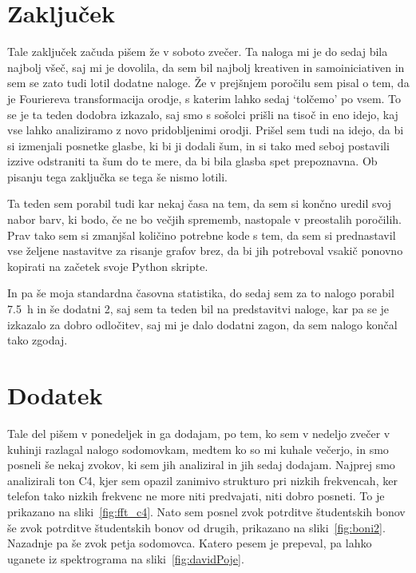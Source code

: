 \documentclass{porocilo}
\begin{document}
\section{Zaključek}
Tale zaključek začuda pišem že v soboto zvečer. Ta naloga mi je do sedaj bila najbolj všeč, saj mi je dovolila, da sem bil najbolj kreativen in samoiniciativen in sem se zato tudi lotil dodatne naloge. Že v prejšnjem poročilu sem pisal o tem, da je Fouriereva transformacija orodje, s katerim lahko sedaj `tolčemo' po vsem. To se je ta teden dodobra izkazalo, saj smo s sošolci prišli na tisoč in eno idejo, kaj vse lahko analiziramo z novo pridobljenimi orodji. Prišel sem tudi na idejo, da bi si izmenjali posnetke glasbe, ki bi ji dodali šum, in si tako med seboj postavili izzive odstraniti ta šum do te mere, da bi bila glasba spet prepoznavna. Ob pisanju tega zaključka se tega še nismo lotili.

Ta teden sem porabil tudi kar nekaj časa na tem, da sem si končno uredil svoj nabor barv, ki bodo, če ne bo večjih sprememb, nastopale v preostalih poročilih. Prav tako sem si zmanjšal količino potrebne kode s tem, da sem si prednastavil vse željene nastavitve za risanje grafov brez, da bi jih potreboval vsakič ponovno kopirati na začetek svoje Python skripte.

In pa še moja standardna časovna statistika, do sedaj sem za to nalogo porabil \SI{7.5}{\hour} in še dodatni 2, saj sem ta teden bil na predstavitvi naloge, kar pa se je izkazalo za dobro odločitev, saj mi je dalo dodatni zagon, da sem nalogo končal tako zgodaj.

\section{Dodatek}
Tale del pišem v ponedeljek in ga dodajam, po tem, ko sem v nedeljo zvečer v kuhinji razlagal nalogo sodomovkam, medtem ko so mi kuhale večerjo, in smo posneli še nekaj zvokov, ki sem jih analiziral in jih sedaj dodajam. Najprej smo analizirali ton C4, kjer sem opazil zanimivo strukturo pri nizkih frekvencah, ker telefon tako nizkih frekvenc ne more niti predvajati, niti dobro posneti. To je prikazano na sliki~\ref{fig:fft_c4}. Nato sem posnel zvok potrditve študentskih bonov še zvok potrditve študentskih bonov od drugih, prikazano na sliki~\ref{fig:boni2}. Nazadnje pa še zvok petja sodomovca. Katero pesem je prepeval, pa lahko uganete iz spektrograma na sliki~\ref{fig:davidPoje}.

\end{document}
